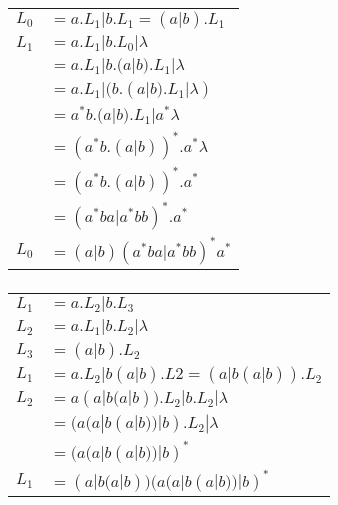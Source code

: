 \subsubsection{}
\begin{tabular}{l l}
$L_0$ & $= a.L_1 | b.L_1 = (a|b).L_1$ \\

$L_1$ & $= a.L_1 | b.L_0 | \lambda$ \\
	  & $= a.L_1 | b.(a|b).L_1 | \lambda$ \\
	  & $= a.L_1 | (b.(a|b).L_1 | \lambda)$ \\
	  & $= a^*b.(a|b).L_1 | a^*\lambda$ \\
	  & $= (a^*b.(a|b))^*.a^*\lambda$ \\
	  & $= (a^*b.(a|b))^*.a^*$ \\
	  & $= (a^*ba|a^*bb)^*.a^*$ \\

$L_0$ & $= (a|b)(a^*ba|a^*bb)^*a^*$ \\
\end{tabular}

\subsubsection{}
\begin{tabular}{l l}
$L_1$ & $= a.L_2 | b.L_3$ \\

$L_2$ & $= a.L_1 | b.L_2 | \lambda$ \\

$L_3$ & $= (a|b).L_2$ \\

$L_1$ & $= a.L_2 | b(a|b).L2 = (a|b(a|b)).L_2$ \\

$L_2$ & $= a(a|b(a|b)).L_2 | b.L_2 | \lambda$ \\
	  & $= (a(a|b(a|b))| b).L_2 | \lambda$ \\
	  & $= (a(a|b(a|b))| b)^*$ \\

$L_1$ & $= (a|b(a|b))(a(a|b(a|b))| b)^*$ \\
\end{tabular}